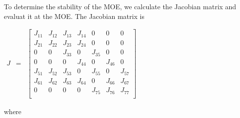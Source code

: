 \documentclass[11pt, oneside]{article}    %
\begin{document}

To determine the stability of the MOE, we calculate the Jacobian matrix and evaluat it at the MOE. The Jacobian matrix is 

\vspace{5mm}

\begin{center}
$\begin{array}{rcl}
J & = & \begin{bmatrix}
J_{11} & J_{12} & J_{13} & J_{14} & 0 & 0 & 0\\
J_{21} & J_{22} & J_{23} & J_{24} & 0 & 0 & 0\\
0 & 0 & J_{33} & 0 & J_{35} & 0 & 0\\
0 & 0 & 0 & J_{44} & 0 & J_{46} & 0 \\
J_{51} & J_{52} & J_{53} & 0 &J_{55} & 0 &J_{57}\\
J_{61} &J_{62} & J_{63} & J_{64} & 0 &J_{66} &  J_{67}\\
0 & 0 & 0 & 0 & J_{75} & J_{76} &J_{77}\\
\end{bmatrix}
\end{array}$
\end{center}

\vspace{5mm}

where

\vspace{5mm}
\end{document}
